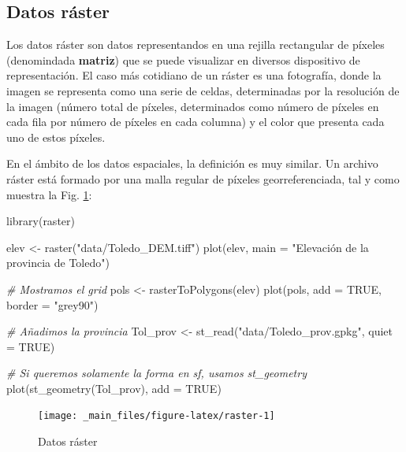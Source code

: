 \documentclass[
]{report}
\newenvironment{Shaded}{\begin{snugshade}}{\end{snugshade}}
\newcommand{\AttributeTok}[1]{\textcolor[rgb]{0.77,0.63,0.00}{#1}}
\newcommand{\CommentTok}[1]{\textcolor[rgb]{0.56,0.35,0.01}{\textit{#1}}}
\newcommand{\ConstantTok}[1]{\textcolor[rgb]{0.00,0.00,0.00}{#1}}
\newcommand{\FunctionTok}[1]{\textcolor[rgb]{0.00,0.00,0.00}{#1}}
\newcommand{\NormalTok}[1]{#1}
\newcommand{\OtherTok}[1]{\textcolor[rgb]{0.56,0.35,0.01}{#1}}
\newcommand{\StringTok}[1]{\textcolor[rgb]{0.31,0.60,0.02}{#1}}
\begin{document}
\hypertarget{raster}{%
\subsection{Datos ráster}\label{raster}}

Los datos ráster son datos representandos en una rejilla rectangular de píxeles
(denomindada \textbf{matriz}) que se puede visualizar en diversos dispositivo de
representación. El caso más cotidiano de un ráster es una fotografía, donde la
imagen se representa como una serie de celdas, determinadas por la resolución de
la imagen (número total de píxeles, determinados como número de píxeles en cada
fila por número de píxeles en cada columna) y el color que presenta cada uno de
estos píxeles.

En el ámbito de los datos espaciales, la definición es muy similar. Un archivo
ráster está formado por una malla regular de píxeles georreferenciada, tal y
como muestra la Fig. \ref{fig:raster}:

\begin{Shaded}
\begin{Highlighting}[]

\FunctionTok{library}\NormalTok{(raster)}

\NormalTok{elev }\OtherTok{\textless{}{-}} \FunctionTok{raster}\NormalTok{(}\StringTok{"data/Toledo\_DEM.tiff"}\NormalTok{)}
\FunctionTok{plot}\NormalTok{(elev, }\AttributeTok{main =} \StringTok{"Elevación de la provincia de Toledo"}\NormalTok{)}

\CommentTok{\# Mostramos el grid}
\NormalTok{pols }\OtherTok{\textless{}{-}} \FunctionTok{rasterToPolygons}\NormalTok{(elev)}
\FunctionTok{plot}\NormalTok{(pols, }\AttributeTok{add =} \ConstantTok{TRUE}\NormalTok{, }\AttributeTok{border =} \StringTok{"grey90"}\NormalTok{)}

\CommentTok{\# Añadimos la provincia}
\NormalTok{Tol\_prov }\OtherTok{\textless{}{-}} \FunctionTok{st\_read}\NormalTok{(}\StringTok{"data/Toledo\_prov.gpkg"}\NormalTok{, }\AttributeTok{quiet =} \ConstantTok{TRUE}\NormalTok{)}

\CommentTok{\# Si queremos solamente la forma en sf, usamos st\_geometry}
\FunctionTok{plot}\NormalTok{(}\FunctionTok{st\_geometry}\NormalTok{(Tol\_prov), }\AttributeTok{add =} \ConstantTok{TRUE}\NormalTok{)}
\end{Highlighting}
\end{Shaded}

\begin{figure}

{\centering \texttt{[image: \_main\_files/figure-latex/raster-1]} 

}

\caption{Datos ráster}\label{fig:raster}
\end{figure}
\end{document}
